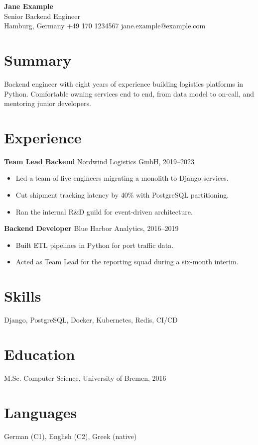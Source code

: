 \documentclass[11pt,a4paper]{article}
\begin{document}
\begin{center}
  {\LARGE\textbf{Jane Example}}\\[2pt]
  Senior Backend Engineer\\[2pt]
  Hamburg, Germany \textbar{} +49 170 1234567 \textbar{} jane.example@example.com
\end{center}

\section*{Summary}
Backend engineer with eight years of experience building logistics platforms in Python.
Comfortable owning services end to end, from data model to on-call, and mentoring junior developers.

\section*{Experience}
\textbf{Team Lead Backend} \hfill Nordwind Logistics GmbH, 2019--2023
\begin{itemize}[leftmargin=*,noitemsep]
  \item Led a team of five engineers migrating a monolith to Django services.
  \item Cut shipment tracking latency by 40\% with PostgreSQL partitioning.
  \item Ran the internal R\&D guild for event-driven architecture.
\end{itemize}

\textbf{Backend Developer} \hfill Blue Harbor Analytics, 2016--2019
\begin{itemize}[leftmargin=*,noitemsep]
  \item Built ETL pipelines in Python for port traffic data.
  \item Acted as Team Lead for the reporting squad during a six-month interim.
\end{itemize}

\section*{Skills}
Django, PostgreSQL, Docker, Kubernetes, Redis, CI/CD

\section*{Education}
M.Sc. Computer Science, University of Bremen, 2016

\section*{Languages}
German (C1), English (C2), Greek (native)
\end{document}
